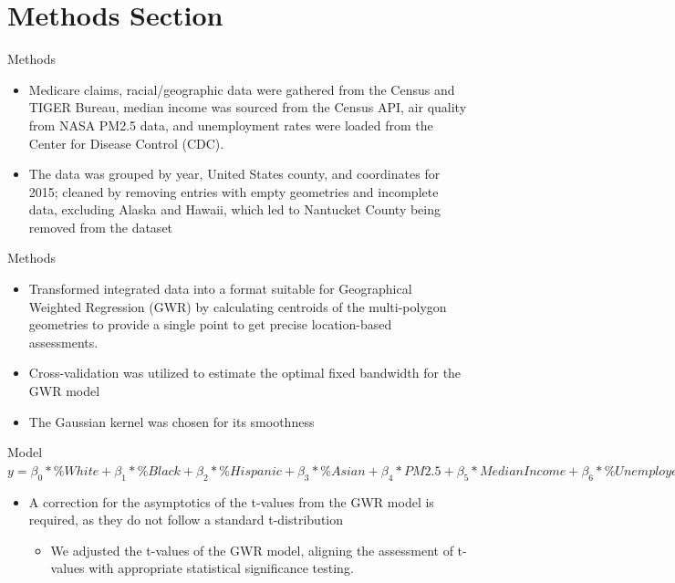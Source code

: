 \documentclass[
  ignorenonframetext,
]{beamer}
\providecommand{\tightlist}{%
  \setlength{\itemsep}{0pt}\setlength{\parskip}{0pt}}\usepackage{longtable,booktabs,array}
\begin{document}
\section{Methods Section}\label{methods-section}

\begin{frame}{Methods}
\label{methods}
\begin{itemize}
\item
  Medicare claims, racial/geographic data were gathered from the Census
  and TIGER Bureau, median income was sourced from the Census API, air
  quality from NASA PM2.5 data, and unemployment rates were loaded from
  the Center for Disease Control (CDC).
\item
  The data was grouped by year, United States county, and coordinates
  for 2015; cleaned by removing entries with empty geometries and
  incomplete data, excluding Alaska and Hawaii, which led to Nantucket
  County being removed from the dataset
\end{itemize}
\end{frame}

\begin{frame}{Methods}
\label{methods-1}
\begin{itemize}
\item
  Transformed integrated data into a format suitable for Geographical
  Weighted Regression (GWR) by calculating centroids of the
  multi-polygon geometries to provide a single point to get precise
  location-based assessments.~
\item
  Cross-validation was utilized to estimate the optimal fixed bandwidth
  for the GWR model
\item
  The Gaussian kernel was chosen for its smoothness
\end{itemize}
\end{frame}

\begin{frame}{Model}
\label{model}
\(y = \beta_0*\%White +\beta_1* \%Black + \beta_2 *\%Hispanic + \beta_3 *\%Asian + \beta_4 *PM2.5 + \beta_5 * Median Income + \beta_6 * \%Unemployed\)

\begin{itemize}
\item
  A correction for the asymptotics of the t-values from the GWR model is
  required, as they do not follow a standard t-distribution

  \begin{itemize}
  \tightlist
  \item
    We adjusted the t-values of the GWR model, aligning the assessment
    of t-values with appropriate statistical significance testing.
  \end{itemize}
\end{itemize}
\end{frame}
\end{document}
